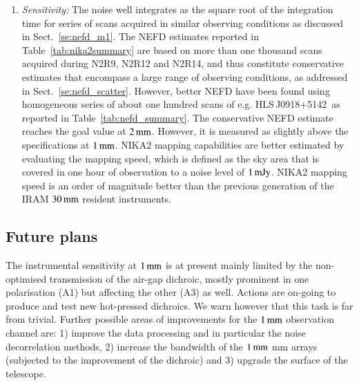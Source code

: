 \documentclass{aa}
\newcommand{\hls}{HLS\,J0918+5142}
\begin{document}
\begin{enumerate}
\item \emph{Sensitivity:} The noise well integrates as the square root of the integration time
  for series of scans acquired in similar observing conditions as
  discussed in Sect.~\ref{se:nefd_m1}. The NEFD estimates reported in
  Table~\ref{tab:nika2summary} are based on more than one thousand scans
  acquired during N2R9, N2R12 and N2R14, and thus constitute
  conservative estimates that encompass a large range of observing
  conditions, as addressed in Sect.~\ref{se:nefd_scatter}. However,
  better NEFD have been found using homogeneous series of about one
  hundred scans of e.g. \hls\, as reported in
  Table~\ref{tab:nefd_summary}.  The conservative NEFD estimate reaches
  the goal value at $2\,\rm{mm}$. However, it is measured as slightly
  above the specifications at $1\,\rm{mm}$.
  NIKA2 mapping capabilities are better estimated by evaluating the
  mapping speed, which is defined as the sky area that is covered in one
  hour of observation to a noise level of $1\,\rm{mJy}$. NIKA2 mapping
  speed is an order of magnitude better than the previous generation of
  the IRAM $30\,\rm{mm}$ resident instruments. 
\end{enumerate}

\subsection*{Future plans}
The instrumental sensitivity at $1\,\rm{mm}$ is at present mainly
limited by the non-optimised transmission of the air-gap dichroic,
mostly prominent in one polarisation (A1) but affecting the other
(A3) as well. Actions are on-going to produce and test new
hot-pressed dichroics. We warn however that this task is far from
trivial.
Further possible areas of improvements for the $1\,\rm{mm}$
observation channel are: 1) improve the data processing and in
particular the noise decorrelation methods, 2) increase the
bandwidth of the $1\,\rm{mm}$ mm arrays (subjected to the
improvement of the dichroic) and 3) upgrade the surface of the
telescope.
  
\end{document}
